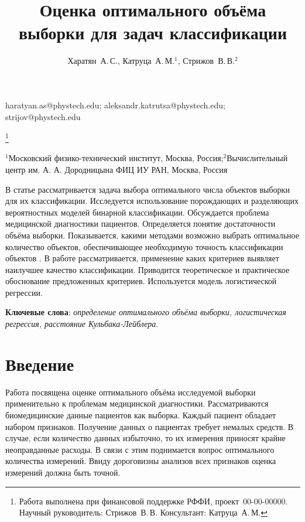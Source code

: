 \documentclass[12pt,twoside]{article}
\begin{document}
\title
    {Оценка оптимального объёма выборки для задач классификации}
\author
    {Харатян~А.\,С., Катруца~А.\,М.$^1$, Стрижов~В.\,В.$^2$} %
\email
	{haratyan.as@phystech.edu; aleksandr.katrutsa@phystech.edu; strijov@phystech.edu}

\thanks
    {Работа выполнена при финансовой поддержке РФФИ, проект \No\,00-00-00000.
     Научный руководитель:  Стрижов~В.\,В.
     Консультант:  Катруца~А.\,М.}

\organization
    {$^1$Московский физико-технический институт, Москва, Россия;$^2$Вычислительный центр им. А. А. Дородницына ФИЦ ИУ РАН, Москва, Россия}
    
\abstract
	{В статье рассматривается задача выбора оптимального числа объектов выборки для их классификации. Исследуется использование порождающих и разделяющих вероятностных моделей бинарной классификации. Обсуждается проблема медицинской диагностики пациентов. Определяется понятие достаточности объёма выборки. Показывается, какими методами возможно выбрать оптимальное количество объектов, обеспечивающее необходимую точность классификации объектов . В работе рассматривается, применение каких критериев выявляет наилучшее качество классификации. Приводится теоретическое и практическое обоснование предложенных критериев. Используется модель логистической регрессии.

\bigskip
\noindent
\textbf{Ключевые слова}: \emph {определение оптимального объёма выборки, логистическая регрессия, расстояние Кульбака-Лейблера}.

}


\maketitle


\section{Введение}

Работа посвящена оценке оптимального объёма исследуемой выборки применительно к проблемам медицинской диагностики. Рассматриваются биомедицинские данные пациентов как выборка. Каждый пациент обладает набором признаков. 
Получение данных о пациентах требует немалых средств. В случае, если количество данных избыточно, то их измерения приносят крайне неоправданные расходы. В связи с этим поднимается вопрос оптимального количества измерений.
Ввиду дороговизны анализов всех признаков оценка измерений должна быть точной. 
\end{document}
